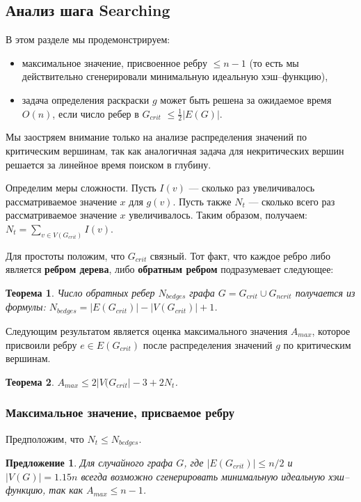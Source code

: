 \documentclass[specialist,
               substylefile = spbu.rtx,
               subf,href,colorlinks=true, 12pt]{disser}
\newtheorem{myth}{Теорема}
\newtheorem{mycon}{Предложение}
\begin{document}
\subsection{Анализ шага Searching}
В этом разделе мы продемонстрируем:
\begin{itemize}
\item максимальное значение, присвоенное ребру $\leq n - 1$ (то есть мы действительно сгенерировали минимальную идеальную хэш--функцию),
\item задача определения раскраски $g$ может быть решена за ожидаемое время $\mathit{O}(n)$, если число ребер в $G_{crit}$ $\leq \frac{1}{2}|E(G)|$. 
\end{itemize}

Мы заостряем внимание только на анализе распределения значений по критическим вершинам, так как аналогичная задача для некритических вершин решается за линейное время поиском в глубину.

Определим меры сложности. Пусть $I(v)$ --- сколько раз увеличивалось рассматриваемое значение $x$ для $g(v)$. Пусть также $N_{t}$ --- сколько всего раз рассматриваемое значение $x$ увеличивалось. Таким образом, получаем: $N_{t} = \sum \limits_{v \in V(G_{crit})} I(v)$.

Для простоты положим, что $G_{crit}$ связный. Тот факт, что каждое ребро либо является \textbf{ребром дерева}, либо \textbf{обратным ребром} подразумевает следующее:
\begin{myth}\label{th1}
Число обратных ребер $N_{bedges}$ графа $G = G_{crit} \cup G_{ncrit}$ получается из формулы: $N_{bedges} = |E(G_{crit})| - |V(G_{crit})| + 1$.
\end{myth}

Следующим результатом является оценка максимального значения $A_{max}$, которое присвоили ребру $e \in E(G_{crit})$ после распределения значений $g$ по критическим вершинам. 

\begin{myth}\label{th2}
$A_{max} \leq 2|V(G_{crit}| - 3 + 2N_{t}$.
\end{myth}

\subsubsection{Максимальное значение, присваемое ребру} \label{secmax}

Предположим, что $N_{t} \leq N_{bedges}$.

\begin{mycon}
Для случайного графа $G$, где $|E(G_{crit})| \leq n/2$ и $|V(G)| = 1.15n$ всегда возможно сгенерировать минимальную идеальную хэш--функцию, так как $A_{max} \leq n - 1$.
\end{mycon}
\end{document}
